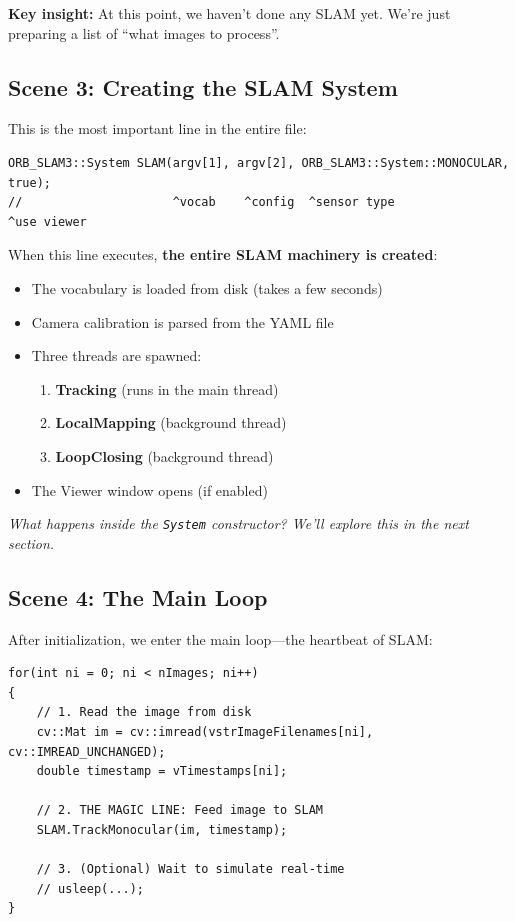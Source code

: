 \textbf{Key insight:} At this point, we haven't done any SLAM yet. We're just preparing a list of ``what images to process''.

\subsection{Scene 3: Creating the SLAM System}

This is the most important line in the entire file:

\begin{lstlisting}[caption={Creating the SLAM System}]
ORB_SLAM3::System SLAM(argv[1], argv[2], ORB_SLAM3::System::MONOCULAR, true);
//                     ^vocab    ^config  ^sensor type              ^use viewer
\end{lstlisting}

When this line executes, \textbf{the entire SLAM machinery is created}:
\begin{itemize}
    \item The vocabulary is loaded from disk (takes a few seconds)
    \item Camera calibration is parsed from the YAML file
    \item Three threads are spawned:
    \begin{enumerate}
        \item \textbf{Tracking} (runs in the main thread)
        \item \textbf{LocalMapping} (background thread)
        \item \textbf{LoopClosing} (background thread)
    \end{enumerate}
    \item The Viewer window opens (if enabled)
\end{itemize}

\textit{What happens inside the \texttt{System} constructor? We'll explore this in the next section.}

\subsection{Scene 4: The Main Loop}

After initialization, we enter the main loop---the heartbeat of SLAM:

\begin{lstlisting}[caption={The main processing loop (simplified)}]
for(int ni = 0; ni < nImages; ni++)
{
    // 1. Read the image from disk
    cv::Mat im = cv::imread(vstrImageFilenames[ni], cv::IMREAD_UNCHANGED);
    double timestamp = vTimestamps[ni];
    
    // 2. THE MAGIC LINE: Feed image to SLAM
    SLAM.TrackMonocular(im, timestamp);
    
    // 3. (Optional) Wait to simulate real-time
    // usleep(...);
}
\end{lstlisting}


